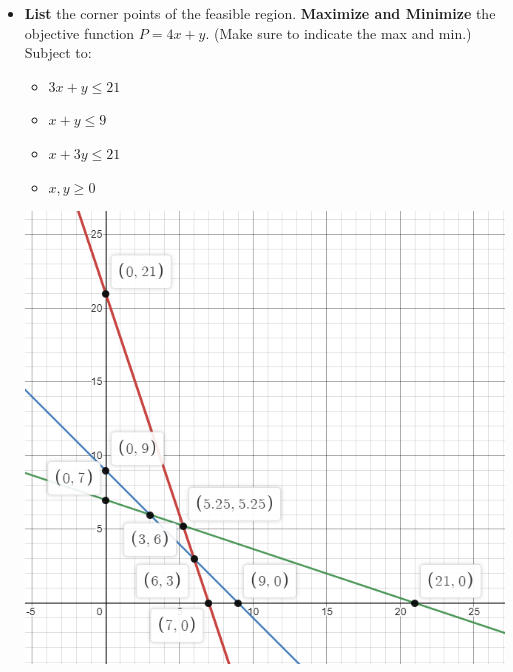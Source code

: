 \documentclass[12pt]{article}
\begin{document}
\begin{itemize}
\begin{itemize}
\item \textbf{List} the corner points of the feasible region. \textbf{Maximize and Minimize} the objective function $P=4x+y$. (Make sure to indicate the max and min.) Subject to:
\begin{itemize}
	\item $3x+y \leq 21$
	\item $x+y \leq 9$
	\item $x+3y \le 21$
	\item $x,y \geq 0$
\end{itemize}
\begin{center}\includegraphics[width=.9\linewidth]{5-2-36}\end{center}



\end{itemize}
\end{itemize}
\end{document}
